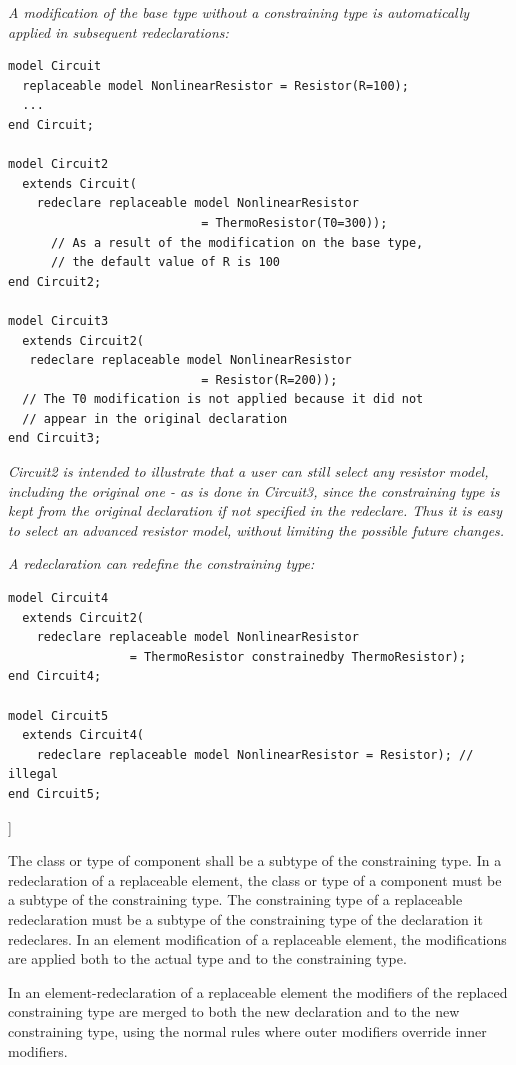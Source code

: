\documentclass[10pt,a4paper]{report}
\begin{document}
\emph{A modification of the base type without a constraining type is
automatically applied in subsequent redeclarations:}
\begin{lstlisting}[language=modelica]
model Circuit
  replaceable model NonlinearResistor = Resistor(R=100);
  ...
end Circuit;

model Circuit2
  extends Circuit(
    redeclare replaceable model NonlinearResistor
                           = ThermoResistor(T0=300));
      // As a result of the modification on the base type,
      // the default value of R is 100
end Circuit2;

model Circuit3
  extends Circuit2(
   redeclare replaceable model NonlinearResistor
                           = Resistor(R=200));
  // The T0 modification is not applied because it did not
  // appear in the original declaration
end Circuit3;
\end{lstlisting}

\emph{Circuit2 is intended to illustrate that a user can still select
any resistor model, including the original one - as is done in Circuit3,
since the constraining type is kept from the original declaration if not
specified in the redeclare. Thus it is easy to select an advanced
resistor model, without limiting the possible future changes. }

\emph{A redeclaration can redefine the constraining type:}
\begin{lstlisting}[language=modelica]
model Circuit4
  extends Circuit2(
    redeclare replaceable model NonlinearResistor
                 = ThermoResistor constrainedby ThermoResistor);
end Circuit4;

model Circuit5
  extends Circuit4(
    redeclare replaceable model NonlinearResistor = Resistor); // illegal
end Circuit5;
\end{lstlisting}

{]}

The class or type of component shall be a subtype of the constraining
type. In a redeclaration of a replaceable element, the class or type of
a component must be a subtype of the constraining type. The constraining
type of a replaceable redeclaration must be a subtype of the
constraining type of the declaration it redeclares. In an element
modification of a replaceable element, the modifications are applied
both to the actual type and to the constraining type.

In an element-redeclaration of a replaceable element the modifiers of
the replaced constraining type are merged to both the new declaration
and to the new constraining type, using the normal rules where outer
modifiers override inner modifiers.
\end{document}
